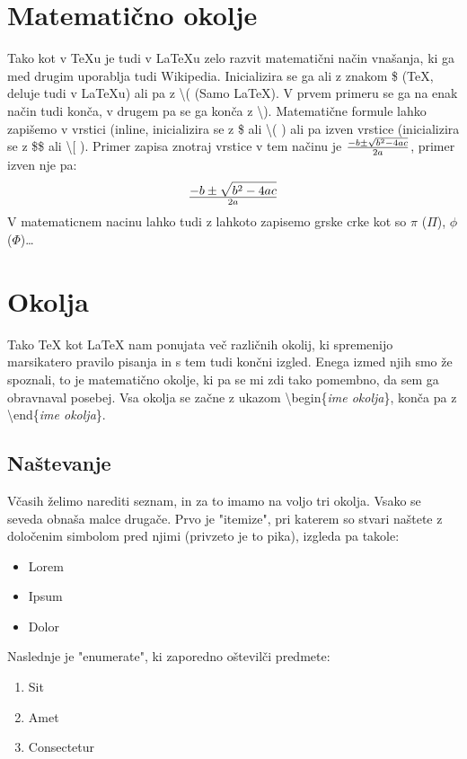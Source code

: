 \documentclass[10p, a4paper, twopage]{book}
\begin{document}
\section{Matematično okolje}
Tako kot v \TeX{}u je tudi v \LaTeX{}u zelo razvit matematični način vnašanja, ki ga med drugim uporablja tudi Wikipedia. Inicializira se ga ali z znakom \${} (\TeX{}, deluje tudi v \LaTeX{}u) ali pa z \textbackslash{}( (Samo \LaTeX{}). V prvem primeru se ga na enak način tudi konča, v drugem pa se ga konča z \textbackslash{}). Matematične formule lahko zapišemo v vrstici (inline, inicializira se z \${} ali \textbackslash{}( ) ali pa izven vrstice (inicializira se z \${}\${} ali \textbackslash{}[ ). Primer zapisa znotraj vrstice v tem načinu je \(- b \pm \sqrt{b^2 - 4ac} \over 2a\), primer izven nje pa: \[- b \pm \sqrt{b^2 - 4ac} \over 2a\] V matematicnem nacinu lahko tudi z lahkoto zapisemo grske crke kot so $\pi{}$ ($\Pi{}$), $\phi{}$ ($\Phi{}$)\ldots


\section{Okolja}

Tako \TeX{} kot \LaTeX{} nam ponujata več različnih okolij, ki spremenijo marsikatero pravilo pisanja in s tem tudi končni izgled. Enega izmed njih smo že spoznali, to je matematično okolje, ki pa se mi zdi tako pomembno, da sem ga obravnaval posebej. Vsa okolja se začne z ukazom \textbackslash{}begin\{{\em ime okolja}\}, konča pa z \textbackslash{}end\{{\em ime okolja}\}.

\subsection{Naštevanje}
Včasih želimo narediti seznam, in za to imamo na voljo tri okolja. Vsako se seveda obnaša malce drugače. Prvo je "itemize", pri katerem so stvari naštete z določenim simbolom pred njimi (privzeto je to pika), izgleda pa takole:
\begin{itemize}
\item Lorem
\item Ipsum
\item Dolor
\end{itemize}

Naslednje je "enumerate", ki zaporedno oštevilči predmete:
\begin{enumerate}
\item Sit
\item Amet
\item Consectetur
\end{enumerate}
\end{document}
